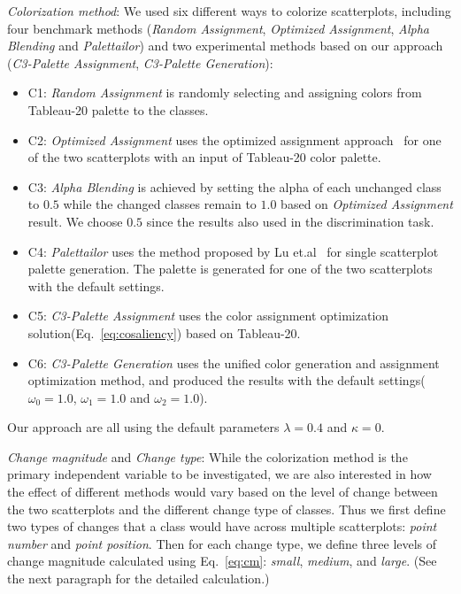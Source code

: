 \emph{Colorization method}: We used six different ways to colorize scatterplots, including four benchmark methods (\emph{Random Assignment}, \emph{Optimized Assignment}, \emph{Alpha Blending} and \emph{Palettailor}) and two experimental methods based on our approach (\emph{C3-Palette Assignment}, \emph{C3-Palette Generation}):
\begin{itemize}

     \item C1: \emph{Random Assignment} is randomly selecting and assigning colors from Tableau-20 palette to the classes.

     \item C2: \emph{Optimized Assignment} uses the optimized assignment approach~\cite{Wang2018} for one of the two scatterplots with an input of Tableau-20 color palette.

     \item C3: \emph{Alpha Blending} is achieved by setting the alpha of each unchanged class to $0.5$ while the changed classes remain to $1.0$ based on \emph{Optimized Assignment} result. We choose $0.5$ since the results also used in the discrimination task.
     \item C4: \emph{Palettailor} uses the method proposed by Lu et.al~\cite{Lu21} for single scatterplot palette generation. The palette is generated for one of the two scatterplots with the default settings.
     \item C5: \emph{C3-Palette Assignment} uses the color assignment optimization solution(Eq.~\ref{eq:cosaliency}) based on Tableau-20.
     \item C6: \emph{C3-Palette Generation} uses the unified color generation and assignment optimization method, and produced the results with the default settings($\omega_0=1.0$, $\omega_1=1.0$ and $\omega_2=1.0$).
\end{itemize}
Our approach are all using the default parameters $\lambda=0.4$ and $\kappa=0$.

\emph{Change magnitude} and \emph{Change type}: While the colorization method is the primary independent variable to be investigated, we are also interested in how the effect of different methods would vary based on the level of change between the two scatterplots and the different change type of classes. Thus we first define two types of changes that a class would have across multiple scatterplots: \emph{point number} and \emph{point position}. Then for each change type, we define three levels of change magnitude calculated using Eq.~\ref{eq:cm}: \emph{small}, \emph{medium}, and \emph{large}. (See the next paragraph for the detailed calculation.)

